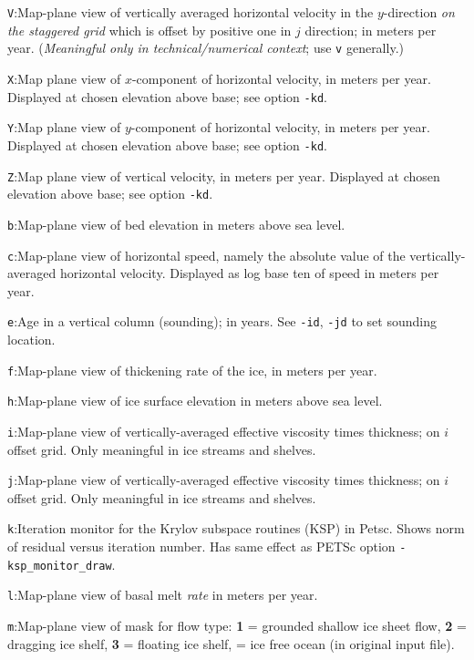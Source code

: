 \documentclass[11pt,final]{amsart}
\begin{document}
\verb|V|:\quad Map-plane view of vertically averaged horizontal velocity in the $y$-direction \emph{on the staggered grid} which is offset by positive one in $j$ direction;  in meters per year.  (\emph{Meaningful only in technical/numerical context}; use \verb|v| generally.)

\verb|X|:\quad Map plane view of $x$-component of horizontal velocity, in meters per year.  Displayed at chosen elevation above base; see option \verb|-kd|.

\verb|Y|:\quad Map plane view of $y$-component of horizontal velocity, in meters per year.  Displayed at chosen elevation above base; see option \verb|-kd|.

\verb|Z|:\quad Map plane view of vertical velocity, in meters per year.  Displayed at chosen elevation above base; see option \verb|-kd|.

\verb|b|:\quad Map-plane view of bed elevation in meters above sea level.

\verb|c|:\quad Map-plane view of horizontal speed, namely the absolute value of the vertically-averaged horizontal velocity.  Displayed as log base ten of speed in meters per year.

\verb|e|:\quad Age in a vertical column (sounding); in years.  See \verb|-id|, \verb|-jd| to set sounding location.

\verb|f|:\quad Map-plane view of thickening rate of the ice, in meters per year.

\verb|h|:\quad Map-plane view of ice surface elevation in meters above sea level.

\verb|i|:\quad Map-plane view of vertically-averaged effective viscosity times thickness; on $i$ offset grid.  Only meaningful in ice streams and shelves.

\verb|j|:\quad Map-plane view of vertically-averaged effective viscosity times thickness; on $i$ offset grid.  Only meaningful in ice streams and shelves.

\verb|k|:\quad \notMat Iteration monitor for the Krylov subspace routines (KSP) in Petsc.  Shows norm of residual versus iteration number.  Has same effect as PETSc option \verb|-ksp_monitor_draw|.

\verb|l|:\quad Map-plane view of basal melt \emph{rate} in meters per year.

\verb|m|:\quad Map-plane view of mask for flow type:  \textbf{1} = grounded shallow ice sheet flow,  \textbf{2} = dragging ice shelf, \textbf{3} = floating ice shelf,  = ice free ocean (in original input file).
\end{document}
